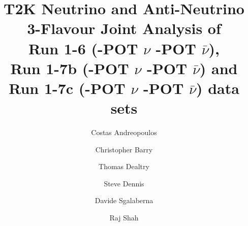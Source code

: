 %
%

\begin{frontmatter}

\title{
  T2K Neutrino and Anti-Neutrino 3-Flavour Joint Analysis of  \\
  Run 1-6 (\TotalPotNu-POT $\nu$  \TotalPotNuBar-POT $\bar{\nu}$), \\
  Run 1-7b (\TotalPotNuRunOneSevenB-POT $\nu$  \TotalPotNuBarRunOneSevenB-POT $\bar{\nu}$) and \\
  Run 1-7c (\TotalPotNuRunOneSevenC-POT $\nu$  \TotalPotNuBarRunOneSevenC-POT $\bar{\nu}$)
  data sets
}

\vspace*{0.7cm}

\author[RAL,LIV]  {Costas Andreopoulos}
\author[LIV]  {Christopher Barry}
\author[LANCS]  {Thomas Dealtry}
\author[RAL,LIV]  {Steve Dennis\\}
\author[GEN]     {Davide Sgalaberna}
\author[RAL,OXF]  {Raj Shah}

\address[RAL]   {Science \& Technology Facilities Council (STFC), Rutherford Appleton Laboratory,\\ Harwell Oxford Campus, OX11 0QX, UK}
\address[LIV]   {University of Liverpool, Physics Department,\\ Liverpool, L69 7ZE, UK} 
\address[OXF]   {University of Oxford, Subdepartment of Particle Physics,\\ Oxford, OX1 3RH, UK}
\address[LANCS] {Lancaster University, Physics Department,\\ Lancaster, LA1 4YB, UK}
\address[GEN]  {University of Geneva, Departement de physique nucleaire et corpusculaire,\\ 1211 Geneve, Switzerland}

%
%

\begin{abstract}


\end{abstract}
\end{frontmatter}
